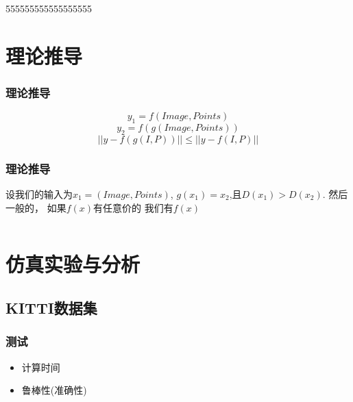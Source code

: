555555555555555555\documentclass{beamer}
\begin{document}
\section{理论推导}
\begin{frame}
  \frametitle{理论推导}
  \begin{equation}
    \label{eq:01}
    y_1=f(Image,Points)
  \end{equation}
  \begin{equation}
    \label{eq:02}
    y_2=f(g(Image,Points))
  \end{equation}
  \begin{equation}
    \label{eq:03}
  ||y-f(g(I,P))|| \leq ||y-f(I,P)||    
  \end{equation}

\end{frame}

\begin{frame}
  \frametitle{理论推导}
  设我们的输入为$x_1=(Image,Points)$,
  $g(x_1)=x_2$,且$D(x_1)>D(x_2)$.
  然后一般的，
  如果$f(x)$有任意价的
  我们有$f(x)$
  
  \begin{equation}
    \label{eq:04}
    
  \end{equation}
\end{frame}
\section{仿真实验与分析}
\subsection{KITTI数据集}
\begin{frame}
  \frametitle{测试}
\begin{itemize}
\item 计算时间
\item 鲁棒性(准确性)
\end{itemize}  
\end{frame}


  
\end{document}
